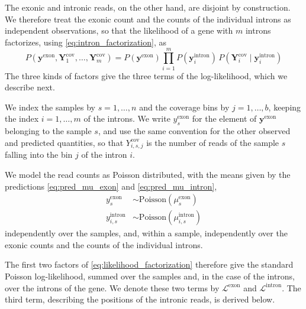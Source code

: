 \documentclass[11pt]{article}
\begin{document}

	The exonic and intronic reads, on the other hand, are disjoint by construction. We therefore treat the exonic count and the counts of the individual introns as independent observations, so that the likelihood of a gene with $m$ introns factorizes, using \eqref{eq:intron_factorization}, as
	\begin{equation} \label{eq:likelihood_factorization}
		P \left( \boldsymbol{y}^{\mathrm{exon}}, \boldsymbol{Y}^{\mathrm{cov}}_{1}, \dots, \boldsymbol{Y}^{\mathrm{cov}}_{m} \right) = P(\boldsymbol{y}^{\mathrm{exon}}) \prod_{i=1}^{m} P(\boldsymbol{y}^{\mathrm{intron}}_{i}) \, P(\boldsymbol{Y}^{\mathrm{cov}}_{i} \mid \boldsymbol{y}^{\mathrm{intron}}_{i})
	\end{equation}
	The three kinds of factors give the three terms of the log-likelihood, which we describe next.

	We index the samples by $s = 1, \dots, n$ and the coverage bins by $j = 1, \dots, b$, keeping the index $i = 1, \dots, m$ of the introns. We write $y^{\mathrm{exon}}_{s}$ for the element of $\boldsymbol{y}^{\mathrm{exon}}$ belonging to the sample $s$, and use the same convention for the other observed and predicted quantities, so that $Y^{\mathrm{cov}}_{i,s,j}$ is the number of reads of the sample $s$ falling into the bin $j$ of the intron $i$.

	We model the read counts as Poisson distributed, with the means given by the predictions \eqref{eq:pred_mu_exon} and \eqref{eq:pred_mu_intron},
	\begin{subequations}
		\begin{align}
			y^{\mathrm{exon}}_{s} &\sim \mathrm{Poisson} \left( \mu^{\mathrm{exon}}_{s} \right) \label{eq:poisson_exon}\\
			y^{\mathrm{intron}}_{i,s} &\sim \mathrm{Poisson} \left( \mu^{\mathrm{intron}}_{i,s} \right) \label{eq:poisson_intron}
		\end{align}
	\end{subequations}
	independently over the samples, and, within a sample, independently over the exonic counts and the counts of the individual introns.

	The first two factors of \eqref{eq:likelihood_factorization} therefore give the standard Poisson log-likelihood, summed over the samples and, in the case of the introns, over the introns of the gene. We denote these two terms by $\mathcal{L}^{\mathrm{exon}}$ and $\mathcal{L}^{\mathrm{intron}}$. The third term, describing the positions of the intronic reads, is derived below.
\end{document}
